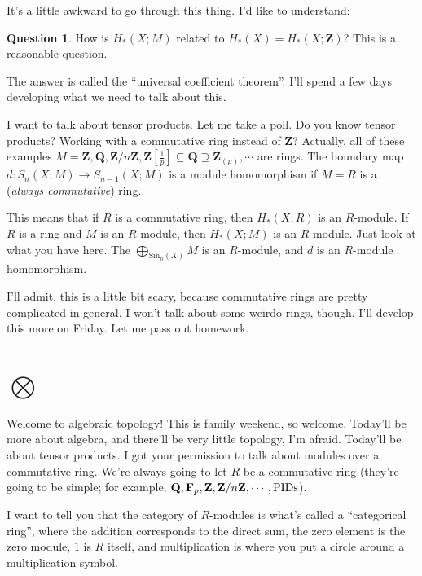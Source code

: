 \documentclass{amsart}
\theoremstyle{theorem}
\theoremstyle{definition}
\newtheorem{question}[theorem]{Question}
\def\QQ{\mathbf Q}\def\RR{\mathbf R}\def\SS{\mathbb S}\def\TT{\mathbb T}
\newcommand{\Z}{\mathbf Z}
\newcommand{\Sin}{\mathrm{Sin}}
\begin{document}
It's a little awkward to go through this thing. I'd like to understand:
\begin{question}
How is $ H_\ast(X;M)$ related to $ H_\ast(X)= H_\ast(X;\Z)$? This is a reasonable question.
\end{question}
The answer is called the ``universal coefficient theorem''. I'll spend a few days developing what we need to talk about this.

I want to talk about tensor products. Let me take a poll. Do you know tensor products? Working with a commutative ring instead of $\Z$? Actually, all of these examples $M=\Z,\QQ,\Z/n\Z,\Z[\frac{1}{p}]\subseteq\QQ\supseteq\Z_{(p)},\cdots$ are rings. The boundary map $d:S_n(X;M)\to S_{n-1}(X;M)$ is a module homomorphism if $M=R$ is a (\emph{always commutative}) ring.

This means that if $R$ is a commutative ring, then $ H_\ast(X;R)$ is an $R$-module. If $R$ is a ring and $M$ is an $R$-module, then $ H_\ast(X;M)$ is an $R$-module. Just look at what you have here. The $\bigoplus_{\Sin_n(X)}M$ is an $R$-module, and $d$ is an $R$-module homomorphism.

I'll admit, this is a little bit scary, because commutative rings are pretty complicated in general. I won't talk about some weirdo rings, though. I'll develop this more on Friday. Let me pass out homework.
\section{$\bigotimes$}
Welcome to algebraic topology! This is family weekend, so welcome. Today'll be more about algebra, and there'll be very little topology, I'm afraid. Today'll be about tensor products. I got your permission to talk about modules over a commutative ring. We're always going to let $R$ be a commutative ring (they're going to be simple; for example, $\QQ,\FF_p,\Z,\Z/n\Z,\cdots,\text{PIDs}$).

I want to tell you that the category of $R$-modules is what's called a ``categorical ring'', where the addition corresponds to the direct sum, the zero element is the zero module, $1$ is $R$ itself, and multiplication is where you put a circle around a multiplication symbol.
\end{document}
